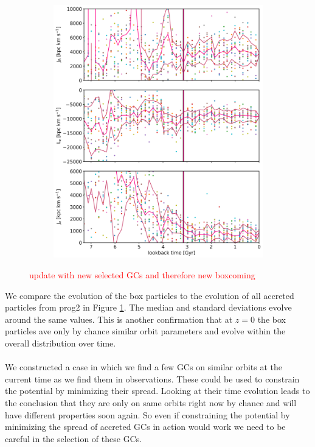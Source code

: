 \begin{figure}[htbp]
\begin{subfigure}[c]{0.48\textwidth}
	    \includegraphics[width=\textwidth]{plots/Dynamics/prog2/action_time_evolution_box_hist_mean_prog2.png}
    \end{subfigure}
    \caption{\textcolor{red}{update with new selected GCs and therefore new boxcoming}}\label{fig:comparison_actions_time_evolution_box_prog2}
\end{figure}
We compare the evolution of the box particles to the evolution of all accreted particles from prog2 in Figure \ref{fig:comparison_actions_time_evolution_box_prog2}. The median and standard deviations evolve around the same values. This is another confirmation that at $z=0$ the box particles ave only by chance similar orbit parameters and evolve within the overall distribution over time. \\\\
We constructed a case in which we find a few \acp{GC} on similar orbits at the current time as we find them in observations. These could be used to constrain the potential by minimizing their spread. Looking at their time evolution leads to the conclusion that they are only on same orbits right now by chance and will have different properties soon again. So even if constraining the potential by minimizing the spread of accreted \acp{GC} in action would work we need to be careful in the selection of these \acp{GC}.
